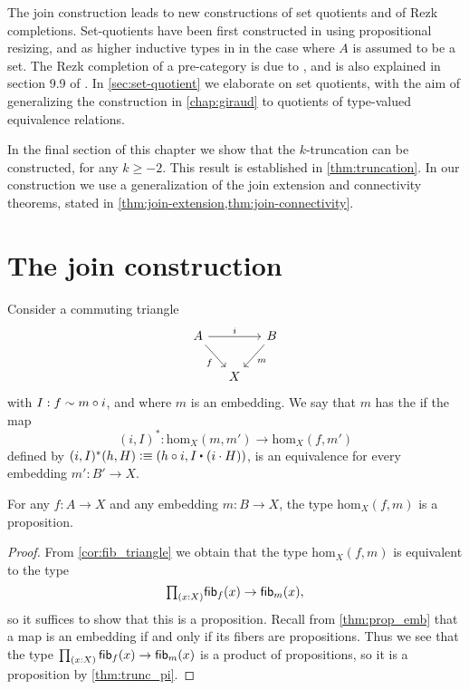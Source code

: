 The join construction leads to new constructions of set quotients and of Rezk completions. Set-quotients have been first constructed in \cite{UniMath2015,UniMath} using propositional resizing, and as higher inductive types in \cite{hottbook} in the case where $A$ is assumed to be a set. The Rezk completion of a pre-category is due to \cite{AhrensKapulkinShulman}, and is also explained in section 9.9 of \cite{hottbook}. In \cref{sec:set-quotient} we elaborate on set quotients, with the aim of generalizing the construction in \cref{chap:giraud} to quotients of type-valued equivalence relations.

In the final section of this chapter we show that the $k$-truncation can be constructed, for any $k\geq -2$. This result is established in \cref{thm:truncation}. In our construction we use a generalization of the join extension and connectivity theorems, stated in \cref{thm:join-extension,thm:join-connectivity}.

\section{The join construction}

\begin{defn}\label{defn:image_up}
Consider a commuting triangle
\begin{equation*}
\begin{tikzcd}[column sep=small]
A \arrow[rr,"i"] \arrow[dr,swap,"f"] & & B \arrow[dl,"m"] \\
& X
\end{tikzcd}
\end{equation*}
with $I:f\sim m\circ i$, and where $m$ is an embedding.
We say that $m$ has the  if the map
\begin{equation*}
(i,I)^\ast : \mathrm{hom}_X(m,m')\to\mathrm{hom}_X(f,m')
\end{equation*}
defined by $(i,I)^\ast(h,H)\defeq (h\circ i,\ct{I}{(i\cdot H)})$,
is an equivalence for every embedding $m':B'\to X$. 
\end{defn}

\begin{lem}
For any $f:A\to X$ and any embedding $m:B\to X$, the type $\mathrm{hom}_X(f,m)$ is a proposition.
\end{lem}

\begin{proof}
From \cref{cor:fib_triangle} we obtain that the type $\mathrm{hom}_X(f,m)$ is equivalent to the type
\begin{equation*}
\prd{x:X}\fib{f}{x}\to\fib{m}{x},
\end{equation*}
so it suffices to show that this is a proposition. 
Recall from \cref{thm:prop_emb} that a map is an embedding if and only if its fibers are propositions.
Thus we see that the type $\prd{x:X}\fib{f}{x}\to\fib{m}{x}$ is a product of propositions, so it is a proposition by \cref{thm:trunc_pi}.
\end{proof}

